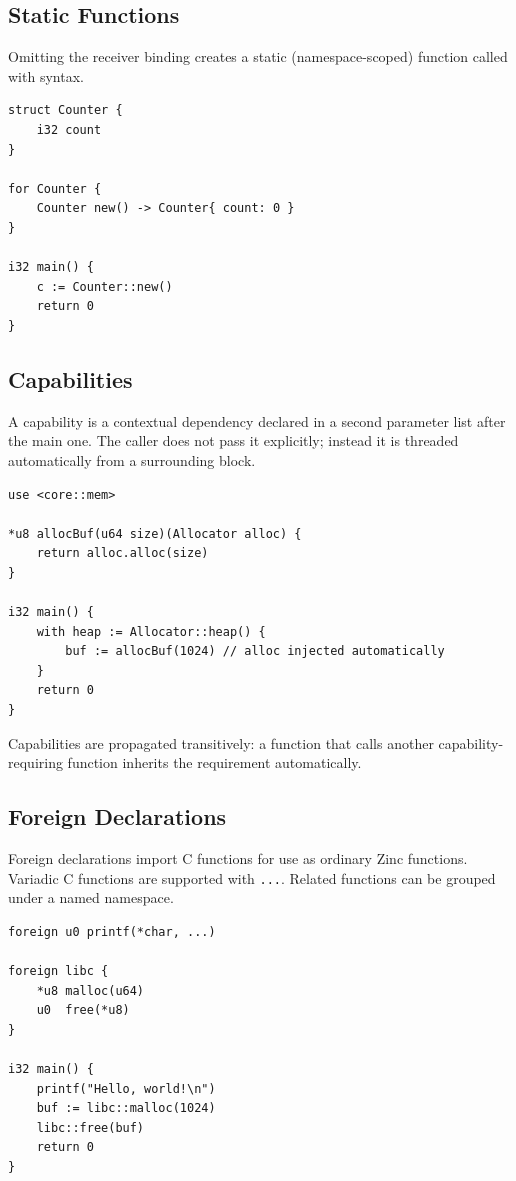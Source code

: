 \subsection{Static Functions}

Omitting the receiver binding creates a static (namespace-scoped) function
called with  syntax.

\begin{lstlisting}[style=zinc, caption={Static functions}]
struct Counter {
    i32 count
}

for Counter {
    Counter new() -> Counter{ count: 0 }
}

i32 main() {
    c := Counter::new()
    return 0
}
\end{lstlisting}

\subsection{Capabilities}

A capability is a contextual dependency declared in a second parameter list
after the main one. The caller does not pass it explicitly; instead it is
threaded automatically from a surrounding  block.

\begin{lstlisting}[style=zinc, caption={Capability declaration and use}]
use <core::mem>

*u8 allocBuf(u64 size)(Allocator alloc) {
    return alloc.alloc(size)
}

i32 main() {
    with heap := Allocator::heap() {
        buf := allocBuf(1024) // alloc injected automatically
    }
    return 0
}
\end{lstlisting}

Capabilities are propagated transitively: a function that calls another
capability-requiring function inherits the requirement automatically.

\subsection{Foreign Declarations}

Foreign declarations import C functions for use as ordinary Zinc functions.
Variadic C functions are supported with \texttt{...}.
Related functions can be grouped under a named namespace.

\begin{lstlisting}[style=zinc, caption={Foreign declarations}]
foreign u0 printf(*char, ...)

foreign libc {
    *u8 malloc(u64)
    u0  free(*u8)
}

i32 main() {
    printf("Hello, world!\n")
    buf := libc::malloc(1024)
    libc::free(buf)
    return 0
}
\end{lstlisting}

